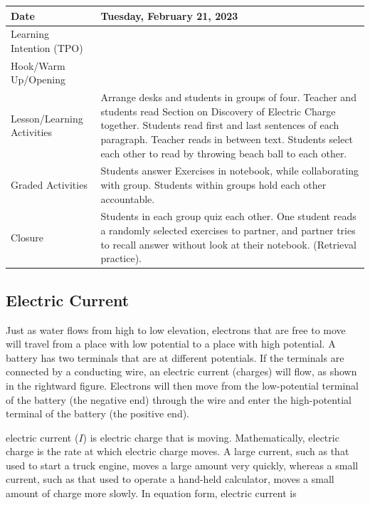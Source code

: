 \documentclass[main.tex]{subfiles}
\begin{document}
\begin{tabular}{|m{}|m{}|}
    \hline  
    \cellcolor{black!20}\textbf{Date} &
    \cellcolor{black!20}\textbf{Tuesday, February 21, 2023} \\
    \hline
    Learning Intention (TPO) &  \\
    \hline
    Hook/Warm Up/Opening & \\
    \hline
    Lesson/Learning Activities & Arrange desks and students in groups of four. Teacher and students read Section on Discovery of Electric Charge together. Students read first and last sentences of each paragraph. Teacher reads in between text. Students select each other to read by throwing beach ball to each other.\\
    \hline
    Graded Activities & Students answer Exercises in notebook, while collaborating with group. Students within groups hold each other accountable.\\
    \hline
    Closure & Students in each group quiz each other. One student reads a randomly selected exercises to partner, and partner tries to recall answer without look at their notebook. (Retrieval practice).\\  
    \hline
\end{tabular}  

\clearpage

\subsection{Electric Current} \label{yDnCNq}


Just as water flows from high to low elevation, electrons that are free to move will travel from a place with low potential to a place with high potential. A battery has two terminals that are at different potentials. If the terminals are connected by a conducting wire, an electric current (charges) will flow, as shown in the rightward figure. Electrons will then move from the low-potential terminal of the battery (the negative end) through the wire and enter the high-potential terminal of the battery (the positive end).

\vspace{1em}

\Gls{electric current} ($I$) is electric charge that is moving. Mathematically, electric charge is the rate at which electric charge moves. A large current, such as that used to start a truck engine, moves a large amount very quickly, whereas a small current, such as that used to operate a hand-held calculator, moves a small amount of charge more slowly. In equation form, electric current is
\end{document}
